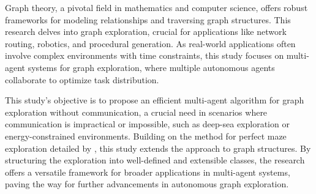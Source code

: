 Graph theory, a pivotal field in mathematics and computer science, offers robust frameworks for modeling relationships and traversing graph structures.
This research delves into graph exploration,
crucial for applications like network routing, robotics, and procedural generation.
As real-world applications often involve complex environments with time constraints,
this study focuses on multi-agent systems for graph exploration,
where multiple autonomous agents collaborate to optimize task distribution.

This study's objective is to propose an efficient multi-agent algorithm for graph exploration without communication,
a crucial need in scenarios where communication is impractical or impossible,
such as deep-sea exploration or energy-constrained environments.
Building on the method for perfect maze exploration detailed by ,
this study extends the approach to graph structures.
By structuring the exploration into well-defined and extensible classes,
the research offers a versatile framework for broader applications in multi-agent systems,
paving the way for further advancements in autonomous graph exploration.